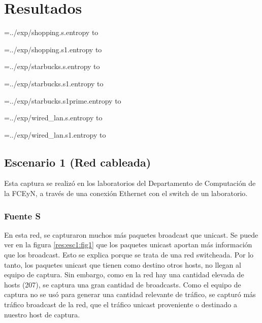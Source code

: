 
\section{Resultados}

\newread\tmp

\openin\tmp=../exp/shopping.s.entropy
\read\tmp to \ShoppingSEntropy
\closein\tmp

\openin\tmp=../exp/shopping.s1.entropy
\read\tmp to \ShoppingSOneEntropy
\closein\tmp

\openin\tmp=../exp/starbucks.s.entropy
\read\tmp to \StarbucksSEntropy
\closein\tmp

\openin\tmp=../exp/starbucks.s1.entropy
\read\tmp to \StarbucksSOneEntropy
\closein\tmp

\openin\tmp=../exp/starbucks.s1prime.entropy
\read\tmp to \StarbucksSOnePrimeEntropy
\closein\tmp

\openin\tmp=../exp/wired_lan.s.entropy
\read\tmp to \WiredLanSEntropy
\closein\tmp

\openin\tmp=../exp/wired_lan.s1.entropy
\read\tmp to \WiredLanSOneEntropy
\closein\tmp

\subsection{Escenario 1 (Red cableada)}

Esta captura se realizó en los laboratorios del Departamento de Computación de la FCEyN, a través de una conexión Ethernet con el switch de un laboratorio.

\subsubsection{Fuente S}

En esta red, se capturaron muchos más paquetes broadcast que unicast. Se puede ver en la figura \ref{res:esc1:fig1}
que los paquetes unicast aportan más información que los broadcast. Esto se explica porque se trata de una red switcheada. Por lo tanto, los paquetes unicast que tienen como destino otros hosts, no llegan al equipo de captura. Sin embargo, como en la red hay una cantidad elevada de hosts (207), se captura una gran cantidad de broadcasts. Como el equipo de captura no se usó para generar una cantidad relevante de tráfico, se capturó más tráfico broadcast de la red, que el tráfico unicast proveniente o destinado a nuestro host de captura.


